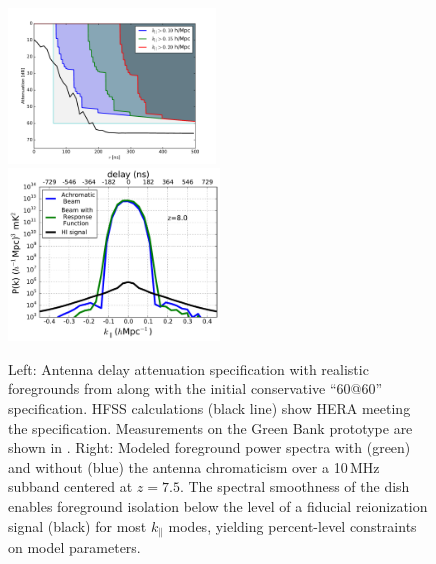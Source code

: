 \documentclass[preprint,11pt]{aastex}
\begin{document}
\begin{figure}[h!]
	\centering
    \includegraphics[width=0.49\textwidth]{plots/delayspecplot.pdf}
     \includegraphics[width=0.5\textwidth]{plots/ps1d_with_delay_kernel.pdf}
	\vspace{-25pt}
	\caption{Left:  Antenna delay attenuation specification with realistic foregrounds from \cite{thyagarajan_et_al2016} along with the initial conservative ``60@60'' specification.  HFSS calculations (black line) show HERA meeting the specification.  Measurements on the Green Bank prototype are shown in  \citep{patra_et_al2016}.
Right: Modeled foreground power spectra with (green) and without (blue) the antenna chromaticism over a 10\,MHz subband centered at $z=7.5$. The spectral smoothness of the dish enables foreground isolation below the level of a fiducial reionization signal (black) for most $k_{\parallel}$ modes, yielding percent-level constraints on model parameters.}
	\label{fig:delayspec}
	\vspace{-10pt}
\end{figure}
\end{document}

